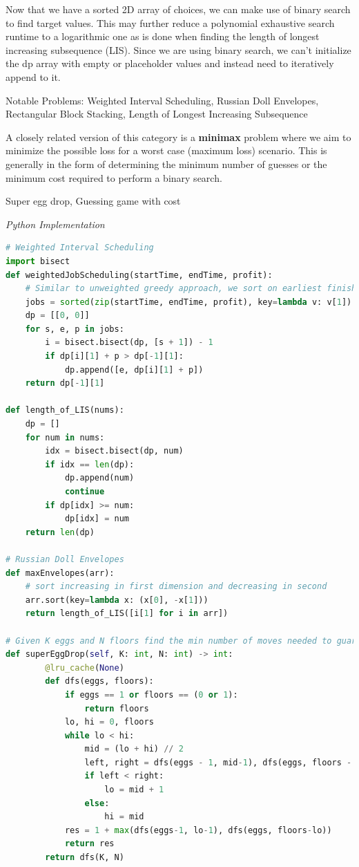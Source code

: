\documentclass{article}
\begin{document}
Now that we have a sorted 2D array of choices, we can make use of binary search to find target values. This may further reduce a polynomial exhaustive search runtime to a logarithmic one as is done when finding the length of longest increasing subsequence (LIS). Since we are using binary search, we can't initialize the dp array with empty or placeholder values and instead need to iteratively append to it. 

Notable Problems: Weighted Interval Scheduling, Russian Doll Envelopes, Rectangular Block Stacking, Length of Longest Increasing Subsequence

A closely related version of this category is a \textbf{minimax} problem where we aim to minimize the possible loss for a worst case (maximum loss) scenario. This is generally in the form of determining the minimum number of guesses or the minimum cost required to perform a binary search.

Super egg drop, Guessing game with cost %

\vspace{8pt} \emph{Python Implementation}
\begin{lstlisting}[language=Python]
# Weighted Interval Scheduling
import bisect
def weightedJobScheduling(startTime, endTime, profit):
    # Similar to unweighted greedy approach, we sort on earliest finish time
    jobs = sorted(zip(startTime, endTime, profit), key=lambda v: v[1])
    dp = [[0, 0]]
    for s, e, p in jobs:
        i = bisect.bisect(dp, [s + 1]) - 1
        if dp[i][1] + p > dp[-1][1]:
            dp.append([e, dp[i][1] + p])
    return dp[-1][1]

def length_of_LIS(nums):
    dp = []
    for num in nums:
        idx = bisect.bisect(dp, num)
        if idx == len(dp):
            dp.append(num)
            continue
        if dp[idx] >= num:
            dp[idx] = num
    return len(dp)

# Russian Doll Envelopes
def maxEnvelopes(arr):
    # sort increasing in first dimension and decreasing in second
    arr.sort(key=lambda x: (x[0], -x[1]))
    return length_of_LIS([i[1] for i in arr])
    
# Given K eggs and N floors find the min number of moves needed to guarantee you find the lowest floor needed to break the egg
def superEggDrop(self, K: int, N: int) -> int:
        @lru_cache(None)
        def dfs(eggs, floors):
            if eggs == 1 or floors == (0 or 1): 
                return floors
            lo, hi = 0, floors
            while lo < hi:
                mid = (lo + hi) // 2
                left, right = dfs(eggs - 1, mid-1), dfs(eggs, floors - mid)
                if left < right:
                    lo = mid + 1
                else:
                    hi = mid
            res = 1 + max(dfs(eggs-1, lo-1), dfs(eggs, floors-lo))
            return res
        return dfs(K, N)
\end{lstlisting}
\end{document}
